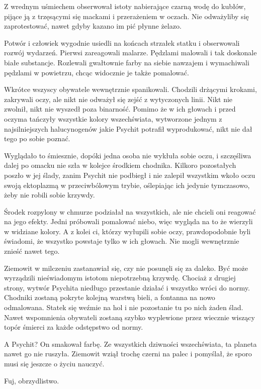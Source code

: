Z wrednym uśmiechem obserwował istoty nabierające czarną wodę do kubłów, pijące ją z trzęsącymi się mackami i przerażeniem w oczach.
Nie odważyliby się zaprotestować, nawet gdyby kazano im pić płynne żelazo.

\divider{}

Potwór i człowiek wygodnie usiedli na końcach strzałek statku i obserwowali rozwój wydarzeń.
Pierwsi zareagowali malarze. Pędzlami malowali i tak doskonale białe substancje. 
Rozlewali gwałtownie farby na siebie nawzajem i wymachiwali pędzlami w powietrzu, chcąc widocznie je także pomalować.

Wkrótce wszyscy obywatele wewnętrznie spanikowali. Chodzili drżącymi krokami, zakrywali oczy, ale nikt nie odważył się zejść z wytyczonych linii.
Nikt nie zwolnił, nikt nie wyszedł poza binarność.
Pomimo że w ich głowach i przed oczyma tańczyły wszystkie kolory wszechświata, wytworzone jednym z najsilniejszych halucynogenów
jakie Psychit potrafił wyprodukować, nikt nie dał tego po sobie poznać.

Wyglądało to śmiesznie, dopóki jedna osoba nie wykłuła sobie oczu, i szczęśliwa dalej po omacku nie szła w kolejce środkiem chodnika.
Kilkoro pozostałych poszło w jej ślady, zanim Psychit nie podbiegł i nie zalepił wszystkim wkoło oczu swoją ektoplazmą w przeciwbólowym trybie, oślepiając ich jedynie tymczasowo, 
żeby nie robili sobie krzywdy.

Środek rozpylony w chmurze podziałał na wszystkich, ale nie chcieli oni reagować na jego efekty.
Jedni próbowali pomalować niebo, więc wygląda na to że wierzyli w widziane kolory.
A z kolei ci, którzy wyłupili sobie oczy, prawdopodobnie byli świadomi, że wszystko powstaje tylko w ich głowach.
Nie mogli wewnętrznie znieść nawet tego.

Ziemowit w milczeniu zastanawiał się, czy nie posunęli się za daleko.
Być może wyrządzili nieświadomym istotom niepotrzebną krzywdę.
Chociaż z drugiej strony, wytwór Psychita niedługo przestanie działać i wszystko wróci do normy.
Chodniki zostaną pokryte kolejną warstwą bieli, a fontanna na nowo odmalowana.
Statek się weźmie na hol i nie pozostanie tu po nich żaden ślad.
Nawet wspomnienia obywateli zostaną szybko wyplewione przez wiecznie wiszący topór śmierci za każde odstępstwo od normy.

A Psychit? On smakował farbę. 
Ze wszystkich dziwności wszechświata, ta planeta nawet go nie ruszyła.
Ziemowit wziął trochę czerni na palec i pomyślał, że sporo musi się jeszcze o życiu nauczyć.

Fuj, obrzydlistwo.







